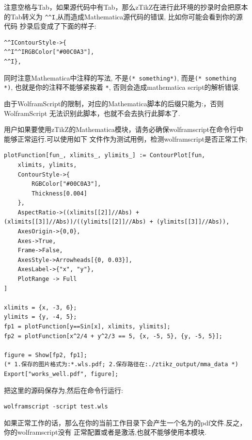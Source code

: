 \begin{leftbar}
\textbullet 注意空格与Tab，如果源代码中有Tab，那么zTikZ在进行此环境的抄录时会把原本
的Tab转义为 \verb|^^I|,从而造成Mathematica源代码的错误, 比如你可能会看到你的源代码
抄录后变成了下面的样子:
\begin{verbatim}
^^IContourStyle->{
^^I^^IRGBColor["#00C0A3"], 
^^I},
\end{verbatim}

\textbullet 同时注意Mathematica中注释的写法, 不是\verb|(* something*)|, 而是\verb|(* something *)|,
也就是你的注释不能够紧挨着 \verb|*|, 否则会造成mathematica script的解析错误.

\textbullet 由于WolframScript的限制，对应的Mathematica脚本的后缀只能为:，否则WolframScript
无法识别此脚本，也就不会去执行此脚本了.
\end{leftbar}

用户如果要使用zTikZ的Mathematica模块，请务必确保wolframscript在命令行中能够正常运行.可以使用如下
文件作为测试用例，检测wolframscript是否正常工作; 
\begin{verbatim}
plotFunction[fun_, xlimits_, ylimits_] := ContourPlot[fun, 
    xlimits, ylimits,
    ContourStyle->{
        RGBColor["#00C0A3"], 
        Thickness[0.004]
    },
    AspectRatio->((xlimits[[2]]//Abs) + (xlimits[[3]]//Abs))/((ylimits[[2]]//Abs) + (ylimits[[3]]//Abs)), 
    AxesOrigin->{0,0}, 
    Axes->True,
    Frame->False,
    AxesStyle->Arrowheads[{0, 0.03}],
    AxesLabel->{"x", "y"},
    PlotRange -> Full
]

xlimits = {x, -3, 6};
ylimits = {y, -4, 5};
fp1 = plotFunction[y==Sin[x], xlimits, ylimits];
fp2 = plotFunction[x^2/4 + y^2/3 == 5, {x, -5, 5}, {y, -5, 5}];

figure = Show[fp2, fp1];
(* 1.保存的图片格式为:*.wls.pdf; 2.保存路径在:./ztikz_output/mma_data *)
Export["works_well.pdf", figure];
\end{verbatim}

把这里的源码保存为,然后在命令行运行:
\begin{verbatim}
wolframscript -script test.wls
\end{verbatim}

如果正常工作的话，那么在你的当前工作目录下会产生一个名为的pdf文件.反之，你的wolframscript没有
正常配置或者是激活,也就不能够使用本模块.

